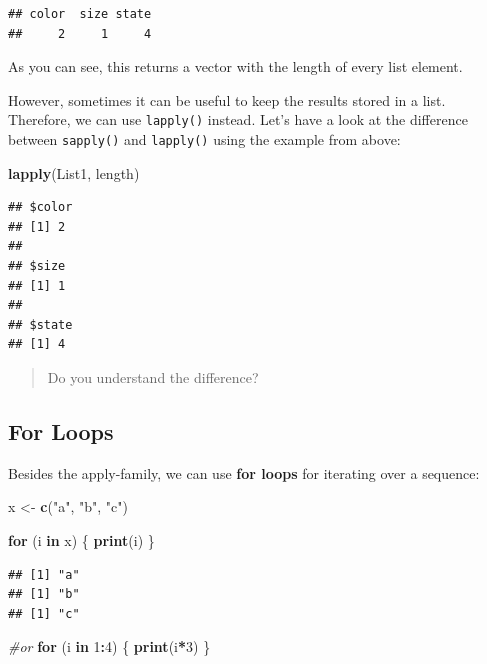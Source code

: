 \documentclass[
]{book}
\newenvironment{Shaded}{\begin{snugshade}}{\end{snugshade}}
\newcommand{\CommentTok}[1]{\textcolor[rgb]{0.56,0.35,0.01}{\textit{#1}}}
\newcommand{\ControlFlowTok}[1]{\textcolor[rgb]{0.13,0.29,0.53}{\textbf{#1}}}
\newcommand{\DecValTok}[1]{\textcolor[rgb]{0.00,0.00,0.81}{#1}}
\newcommand{\FunctionTok}[1]{\textcolor[rgb]{0.13,0.29,0.53}{\textbf{#1}}}
\newcommand{\NormalTok}[1]{#1}
\newcommand{\OtherTok}[1]{\textcolor[rgb]{0.56,0.35,0.01}{#1}}
\newcommand{\SpecialCharTok}[1]{\textcolor[rgb]{0.81,0.36,0.00}{\textbf{#1}}}
\newcommand{\StringTok}[1]{\textcolor[rgb]{0.31,0.60,0.02}{#1}}
\begin{document}
\begin{verbatim}
## color  size state 
##     2     1     4
\end{verbatim}

As you can see, this returns a vector with the length of every list element.

However, sometimes it can be useful to keep the results stored in a list.
Therefore, we can use \texttt{lapply()} instead.
Let's have a look at the difference between \texttt{sapply()} and \texttt{lapply()} using the example from above:

\begin{Shaded}
\begin{Highlighting}[]
\FunctionTok{lapply}\NormalTok{(List1, length)}
\end{Highlighting}
\end{Shaded}

\begin{verbatim}
## $color
## [1] 2
## 
## $size
## [1] 1
## 
## $state
## [1] 4
\end{verbatim}

\begin{quote}
Do you understand the difference?
\end{quote}

\hypertarget{for-loops}{%
\subsection*{For Loops}\label{for-loops}}

Besides the apply-family, we can use \textbf{for loops} for iterating over a sequence:

\begin{Shaded}
\begin{Highlighting}[]
\NormalTok{x }\OtherTok{\textless{}{-}} \FunctionTok{c}\NormalTok{(}\StringTok{"a"}\NormalTok{, }\StringTok{"b"}\NormalTok{, }\StringTok{"c"}\NormalTok{)}

\ControlFlowTok{for}\NormalTok{ (i }\ControlFlowTok{in}\NormalTok{ x) \{}
  \FunctionTok{print}\NormalTok{(i)}
\NormalTok{\}}
\end{Highlighting}
\end{Shaded}

\begin{verbatim}
## [1] "a"
## [1] "b"
## [1] "c"
\end{verbatim}

\begin{Shaded}
\begin{Highlighting}[]
\CommentTok{\#or }
\ControlFlowTok{for}\NormalTok{ (i }\ControlFlowTok{in} \DecValTok{1}\SpecialCharTok{:}\DecValTok{4}\NormalTok{) \{}
  \FunctionTok{print}\NormalTok{(i}\SpecialCharTok{*}\DecValTok{3}\NormalTok{)}
\NormalTok{\}}
\end{Highlighting}
\end{Shaded}
\end{document}
